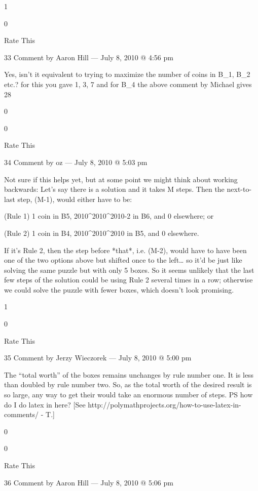     1
     
    0
     
    Rate This

    33 Comment by Aaron Hill — July 8, 2010 @ 4:56 pm

        Yes, isn’t it equivalent to trying to maximize the number of coins in B_1, B_2 etc.?
        for this you gave 1, 3, 7 and for B_4 the above comment by Michael gives 28
         
        0
         
        0
         
        Rate This

        34 Comment by oz — July 8, 2010 @ 5:03 pm

    Not sure if this helps yet, but at some point we might think about working backwards:
    Let’s say there is a solution and it takes M steps. Then the next-to-last step, (M-1), would either have to be:

    (Rule 1) 1 coin in B5, 2010^{2010^{2010}}-2 in B6, and 0 elsewhere; or

    (Rule 2) 1 coin in B4, 2010^{2010^{2010}} in B5, and 0 elsewhere.

    If it’s Rule 2, then the step before *that*, i.e. (M-2), would have to have been one of the two options above but shifted once to the left… so it’d be just like solving the same puzzle but with only 5 boxes.
    So it seems unlikely that the last few steps of the solution could be using Rule 2 several times in a row; otherwise we could solve the puzzle with fewer boxes, which doesn’t look promising.
     
    1
     
    0
     
    Rate This

    35 Comment by Jerzy Wieczorek — July 8, 2010 @ 5:00 pm

        The “total worth” of the boxes remains unchanges by rule number one. It is less than doubled by rule number two. So, as the total worth of the desired result is so large, any way to get their would take an enormous number of steps. PS how do I do latex in here? [See http://polymathprojects.org/how-to-use-latex-in-comments/ - T.]
         
        0
         
        0
         
        Rate This

        36 Comment by Aaron Hill — July 8, 2010 @ 5:06 pm

